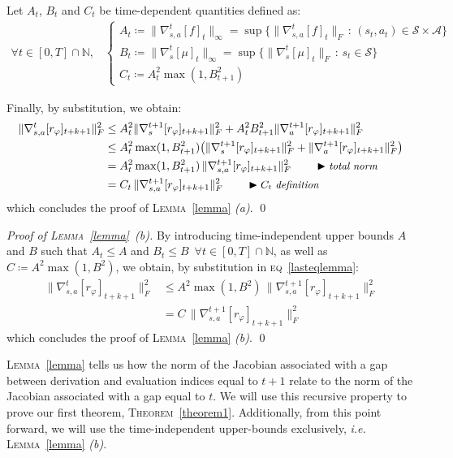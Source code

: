 Let $A_t$, $B_t$ and $C_t$ be time-dependent quantities defined as:
\begin{align}
\forall t \in [0, T] \cap \mathbb{N} \text{,} \quad
\begin{cases}
A_t \coloneqq \lVert\nabla_{s,a}^t[f]_t\rVert _\infty
= \sup \big\{\lVert\nabla_{s,a}^t[f]_t\rVert _F \, : \, (s_t, a_t) \in
\mathcal{S} \times \mathcal{A} \big\} \\
B_t \coloneqq \lVert\nabla_s^t[\mu]_t\rVert _\infty
= \sup \big\{\lVert\nabla_s^t[\mu]_t\rVert _F \, : \, s_t \in
\mathcal{S} \big\} \\
C_t \coloneqq A_t^2 \max(1, B_{t+1}^2)
\end{cases}
\label{aandb}
\end{align}

Finally, by substitution, we obtain:
\begin{align}
\lVert \nabla_{s,a}^t[r_\varphi]_{t+k+1} \rVert ^2_F
&\leq
A_t^2 \lVert\nabla_s^{t+1}[r_\varphi]_{t+k+1}\rVert ^2_F +
A_t^2 B_{t+1}^2 \lVert\nabla_a^{t+1}[r_\varphi]_{t+k+1}\rVert ^2_F \\
&\leq
A_t^2 \max(1, B_{t+1}^2) \big(\lVert\nabla_s^{t+1}[r_\varphi]_{t+k+1}\rVert ^2_F +
\lVert\nabla_a^{t+1}[r_\varphi]_{t+k+1}\rVert ^2_F\big) \\
&=
A_t^2 \max(1, B_{t+1}^2) \, \lVert \nabla_{s,a}^{t+1}[r_\varphi]_{t+k+1} \rVert ^2_F
\qquad
\blacktriangleright\text{\small{\textit{total norm}}}
\label{lasteqlemma} \\
&=
C_t \, \lVert \nabla_{s,a}^{t+1}[r_\varphi]_{t+k+1} \rVert ^2_F
\qquad
\blacktriangleright\text{\small{$C_t$ \textit{definition}}}
\end{align}
which concludes the proof of \textsc{Lemma}~\ref{lemma} \emph{(a)}. \qed

\emph{Proof of \textsc{Lemma}~\ref{lemma}~\emph{(b)}.}
By introducing time-independent upper bounds $A$ and $B$ such that
$A_t \leq A$ and $B_t \leq B$
$\, \forall t \in [0, T] \cap \mathbb{N}$,
as well as $C \coloneqq A^2 \max(1, B^2)$,
we obtain, by substitution in \textsc{eq}~\ref{lasteqlemma}:
\begin{align}
\lVert \nabla_{s,a}^t[r_\varphi]_{t+k+1} \rVert ^2_F
&\leq
A^2 \max(1, B^2) \, \lVert \nabla_{s,a}^{t+1}[r_\varphi]_{t+k+1} \rVert ^2_F \\
&=
C \, \lVert \nabla_{s,a}^{t+1}[r_\varphi]_{t+k+1} \rVert ^2_F
\end{align}
which concludes the proof of \textsc{Lemma}~\ref{lemma} \emph{(b)}. \qed

\textsc{Lemma}~\ref{lemma} tells us how the norm of the Jacobian associated with a gap
between derivation and evaluation indices equal to $t+1$ relate to the
norm of the Jacobian associated with a gap equal to $t$.
We will use this recursive property to prove our first theorem, \textsc{Theorem}~\ref{theorem1}.
Additionally, from this point forward, we will use the time-independent upper-bounds exclusively,
\textit{i.e.} \textsc{Lemma}~\ref{lemma} \textit{(b)}.

